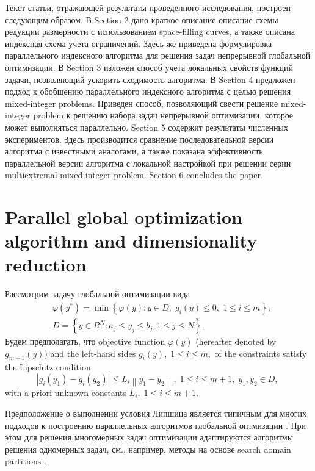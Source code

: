 \documentclass[
11pt,%
tightenlines,%
twoside,%
onecolumn,%
nofloats,%
nobibnotes,%
nofootinbib,%
superscriptaddress,%
noshowpacs,%
centertags]%
{revtex4}
\begin{document}
Текст статьи, отражающей результаты проведенного исследования, построен следующим образом. 
В Section 2 дано краткое описание описание схемы редукции размерности с использованием space-filling curves, а также описана индексная схема учета ограничений. Здесь же приведена формулировка параллельного индексного алгоритма для решения задач непрерывной глобальной оптимизации.
В Section 3 изложен способ учета локальных свойств функций задачи, позволяющий ускорить сходимость алгоритма.
В Section 4 предложен подход к обобщению параллельного индексного алгоритма с целью решения mixed-integer problems. Приведен способ, позволяющий свести решение mixed-integer problem к решению набора задач непрерывной оптимизации, которое может выполняться параллельно. 
Section 5 содержит результаты численных экспериментов. Здесь производится сравнение последовательной версии алгоритма с известными аналогами, а также показана эффективность параллельной версии алгоритма с локальной настройкой при решении серии multiextremal mixed-integer problem.  
Section 6 concludes the paper.



\section{Parallel global optimization algorithm and dimensionality reduction}

Рассмотрим задачу глобальной оптимизации вида
\begin{eqnarray}\label{problem}
&\varphi(y^\ast)=\min{\left\{\varphi(y):y\in D, \; g_i(y)\leq 0, \; 1 \leq i \leq m\right\}},\\
&D=\left\{y\in R^N: a_j\leq y_j \leq b_j, 1\leq j \leq N \right\}.\label{D}
\end{eqnarray}
Будем предполагать, что objective function $\varphi(y)$ (hereafter denoted by $g_{m+1}(y)$) and the left-hand sides $g_i(y), \; 1\leq i \leq m,$ of the constraints satisfy the Lipschitz condition 
\[
\left|g_i(y_1)-g_i(y_2)\right|\leq L_i\left\|y_1-y_2\right\|, \;1\leq i\leq m+1, \; y_1,y_2 \in D,\;
\]
with a priori unknown constants $L_i, \; 1 \leq i \leq m+1$. 

Предположение о выполнении условия Липшица является типичным для многих подходов к построению параллельных алгоритмов глобальной оптмизации \cite{Evtushenko2009,Zilinskas2011}. При этом для решения многомерных задач оптимизации адаптируются алгоритмы решения одномерных задач, см., например, методы на основе search domain partitions \cite{Zilinskas2014,Sergeyev2017}.
\end{document}
